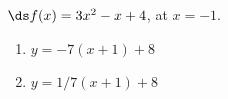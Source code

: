{$\ds f(x) = 3x^2-x+4$, at $x=-1$.
}
{\begin{enumerate}
\item		$y = -7(x+1)+8$
\item		$y = 1/7(x+1)+8$
\end{enumerate}
}
